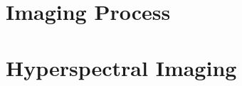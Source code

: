 \begin{figure}[H]
  \newcommand*\FigVSkip{0.5em}
  \newcommand*\FigHSkip{0.1em}
  \newsavebox\FigBox
  \centering
  \begin{minipage}{\wd\FigBox}
    \centering\usebox{\FigBox}
  \end{minipage}
  \begin{minipage}{\wd\FigBox}
    \centering\usebox{\FigBox}
  \end{minipage}\hspace*{\FigHSkip}
  \label{head}
\end{figure}

\section{Imaging Process}

\section{Hyperspectral Imaging}

